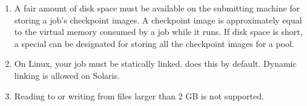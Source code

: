 \begin{enumerate}
\item A fair amount of disk space must be available on the submitting machine
for storing a job's checkpoint images.  A checkpoint image is approximately
equal to the virtual memory consumed by a job while it runs.  If disk space
is short, a special  can be designated for storing
all the checkpoint images for a pool.

\item On Linux, your job must be statically linked. 
 does this by default.
Dynamic linking is allowed on Solaris.

\item Reading to or writing from files larger than 2 GB is not supported.

\end{enumerate}
